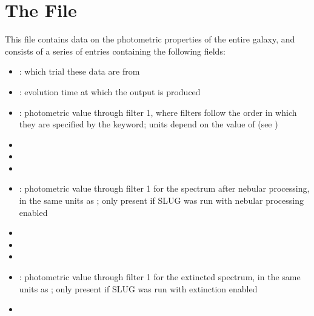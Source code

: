 \documentclass[letterpaper,10pt,english]{sphinxmanual}
\begin{document}
\section{The  File}
\label{\detokenize{output:the-integrated-phot-file}}\label{\detokenize{output:ssec-int-phot-file}}
This file contains data on the photometric properties of the entire galaxy, and consists of a series of entries containing the following fields:
\begin{itemize}
\item {} 
: which trial these data are from

\item {} 
: evolution time at which the output is produced

\item {} 
: photometric value through filter 1, where filters follow the order in which they are specified by the  keyword; units depend on the value of  (see {\hyperref[\detokenize{parameters:ssec-phot-keywords}]{}})

\item {} 

\item {} 

\item {} 

\item {} 
: photometric value through filter 1 for the spectrum after nebular processing, in the same units as ; only present if SLUG was run with nebular processing enabled

\item {} 

\item {} 

\item {} 

\item {} 
: photometric value through filter 1 for the extincted spectrum, in the same units as ; only present if SLUG was run with extinction enabled

\item {} 


\end{itemize}
\end{document}
